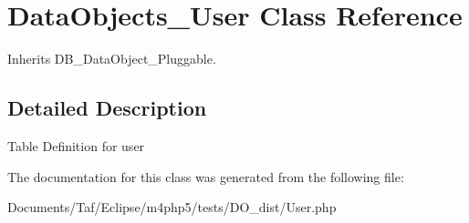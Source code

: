 \hypertarget{classDataObjects__User}{
\section{DataObjects\_\-User Class Reference}
\label{classDataObjects__User}
}
Inherits DB\_\-DataObject\_\-Pluggable.



\subsection{Detailed Description}
Table Definition for user 

The documentation for this class was generated from the following file:\begin{CompactItemize}
\item 
Documents/Taf/Eclipse/m4php5/tests/DO\_\-dist/User.php\end{CompactItemize}
